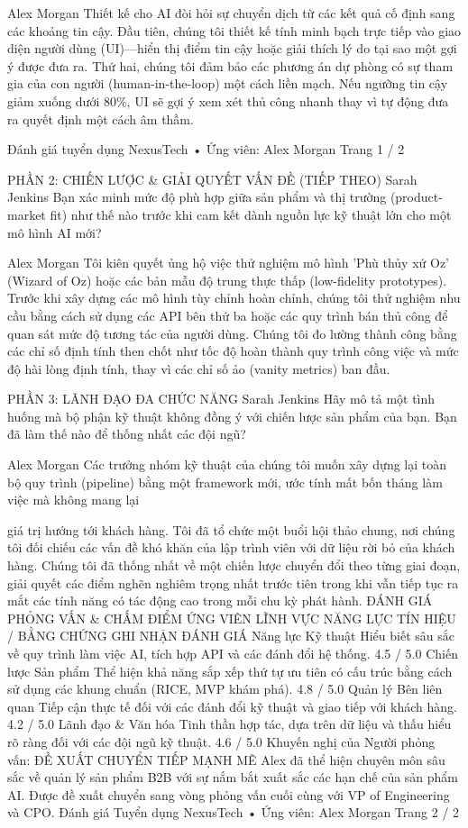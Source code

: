 Alex Morgan
Thiết kế cho AI đòi hỏi sự chuyển dịch từ các kết quả cố định sang các khoảng tin cậy. Đầu tiên, chúng tôi thiết kế tính minh bạch trực tiếp vào giao diện người dùng (UI)—hiển thị điểm tin cậy hoặc giải thích lý do tại sao một gợi ý được đưa ra. Thứ hai, chúng tôi đảm bảo các phương án dự phòng có sự tham gia của con người (human-in-the-loop) một cách liền mạch. Nếu ngưỡng tin cậy giảm xuống dưới 80\%, UI sẽ gợi ý xem xét thủ công nhanh thay vì tự động đưa ra quyết định một cách âm thầm.

Đánh giá tuyển dụng NexusTech • Ứng viên: Alex Morgan
Trang 1 / 2

PHẦN 2: CHIẾN LƯỢC \& GIẢI QUYẾT VẤN ĐỀ (TIẾP THEO)
Sarah Jenkins
Bạn xác minh mức độ phù hợp giữa sản phẩm và thị trường (product-market fit) như thế nào trước khi cam kết dành nguồn lực kỹ thuật lớn cho một mô hình AI mới?

Alex Morgan
Tôi kiên quyết ủng hộ việc thử nghiệm mô hình 'Phù thủy xứ Oz' (Wizard of Oz) hoặc các bản mẫu độ trung thực thấp (low-fidelity prototypes). Trước khi xây dựng các mô hình tùy chỉnh hoàn chỉnh, chúng tôi thử nghiệm nhu cầu bằng cách sử dụng các API bên thứ ba hoặc các quy trình bán thủ công để quan sát mức độ tương tác của người dùng. Chúng tôi đo lường thành công bằng các chỉ số định tính then chốt như tốc độ hoàn thành quy trình công việc và mức độ hài lòng định tính, thay vì các chỉ số ảo (vanity metrics) ban đầu.

PHẦN 3: LÃNH ĐẠO ĐA CHỨC NĂNG
Sarah Jenkins
Hãy mô tả một tình huống mà bộ phận kỹ thuật không đồng ý với chiến lược sản phẩm của bạn. Bạn đã làm thế nào để thống nhất các đội ngũ?

Alex Morgan
Các trưởng nhóm kỹ thuật của chúng tôi muốn xây dựng lại toàn bộ quy trình (pipeline) bằng một framework mới, ước tính mất bốn tháng làm việc mà không mang lại

giá trị hướng tới khách hàng. Tôi đã tổ chức một buổi hội thảo chung, nơi chúng tôi đối chiếu các vấn đề khó khăn của lập trình viên với dữ liệu rời bỏ của khách hàng. Chúng tôi đã thống nhất về một chiến lược chuyển đổi theo từng giai đoạn, giải quyết các điểm nghẽn nghiêm trọng nhất trước tiên trong khi vẫn tiếp tục ra mắt các tính năng có tác động cao trong mỗi chu kỳ phát hành.
ĐÁNH GIÁ PHỎNG VẤN \& CHẤM ĐIỂM ỨNG VIÊN
LĨNH VỰC NĂNG LỰC
TÍN HIỆU / BẰNG CHỨNG GHI NHẬN
ĐÁNH GIÁ
Năng lực Kỹ thuật
Hiểu biết sâu sắc về quy trình làm việc AI, tích hợp API và các đánh đổi hệ thống.
4.5 /
5.0
Chiến lược Sản phẩm
Thể hiện khả năng sắp xếp thứ tự ưu tiên có cấu trúc bằng cách sử dụng các khung chuẩn (RICE, MVP khám phá).
4.8 /
5.0
Quản lý Bên liên quan
Tiếp cận thực tế đối với các đánh đổi kỹ thuật và giao tiếp với khách hàng.
4.2 /
5.0
Lãnh đạo \&
Văn hóa
Tinh thần hợp tác, dựa trên dữ liệu và thấu hiểu rõ ràng đối với các đội ngũ kỹ thuật.
4.6 /
5.0
Khuyến nghị của Người phỏng vấn: ĐỀ XUẤT CHUYỂN TIẾP MẠNH MẼ
Alex đã thể hiện chuyên môn sâu sắc về quản lý sản phẩm B2B với sự nắm bắt xuất sắc các hạn chế của sản phẩm AI. Được đề xuất chuyển sang vòng phỏng vấn cuối cùng với VP of Engineering và CPO.
Đánh giá Tuyển dụng NexusTech • Ứng viên: Alex Morgan
Trang 2 / 2
